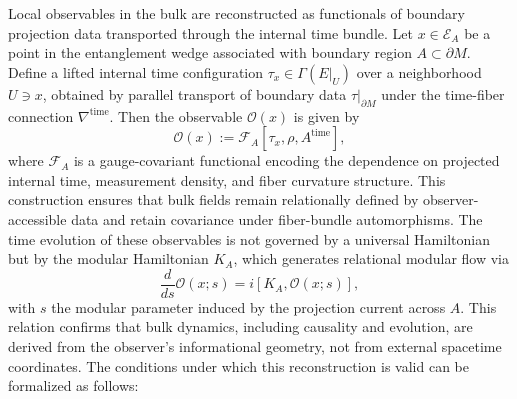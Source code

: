 \documentclass[11pt]{article}
\begin{document}
Local observables in the bulk are reconstructed as functionals of boundary projection data transported through the internal time bundle. Let \( x \in \mathcal{E}_A \) be a point in the entanglement wedge associated with boundary region \( A \subset \partial M \). Define a lifted internal time configuration \( \tau_x \in \Gamma(E|_U) \) over a neighborhood \( U \ni x \), obtained by parallel transport of boundary data \( \tau|_{\partial M} \) under the time-fiber connection \( \nabla^{\mathrm{time}} \). Then the observable \( \mathcal{O}(x) \) is given by
\begin{equation}
\mathcal{O}(x) := \mathcal{F}_A[\tau_x, \rho, A^{\mathrm{time}}],
\end{equation}
where \( \mathcal{F}_A \) is a gauge-covariant functional encoding the dependence on projected internal time, measurement density, and fiber curvature structure. This construction ensures that bulk fields remain relationally defined by observer-accessible data and retain covariance under fiber-bundle automorphisms. The time evolution of these observables is not governed by a universal Hamiltonian but by the modular Hamiltonian \( K_A \), which generates relational modular flow via
\begin{equation}
\frac{d}{ds} \mathcal{O}(x; s) = i [K_A, \mathcal{O}(x; s)],
\end{equation}
with \( s \) the modular parameter induced by the projection current across \( A \). This relation confirms that bulk dynamics, including causality and evolution, are derived from the observer's informational geometry, not from external spacetime coordinates. The conditions under which this reconstruction is valid can be formalized as follows:
\end{document}
